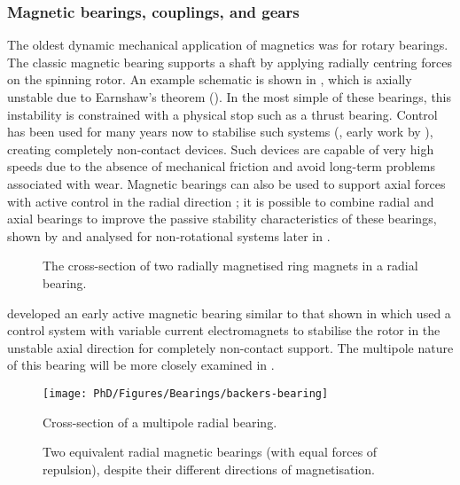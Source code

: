 \documentclass[11pt,a4paper]{memoir}
\begin{document}
\subsubsection{Magnetic bearings, couplings, and gears}

The oldest dynamic mechanical application of magnetics was for rotary
bearings.
The classic magnetic bearing supports a shaft by applying radially centring forces on the spinning rotor.
An example schematic is shown in , which is axially unstable due to Earnshaw's theorem ().
In the most simple of these bearings, this instability is constrained with a physical stop such as a thrust bearing.
Control has been used for many years now to stabilise such systems (\eg, early work by \textcite{shimizu1968}), creating completely non-contact devices.
Such devices are capable of very high speeds due to the absence of mechanical friction and avoid long-term problems associated with wear.
Magnetic bearings can also be used to support axial forces with active control in the radial direction \cite{asami2005}; it is possible to combine radial and axial bearings to improve the passive stability characteristics of these bearings, shown by \textcite{delamare1994-ietm} and analysed for non-rotational systems later in .

\begin{figure}
  \caption[Radial bearing cross section.]{The cross-section of two radially
magnetised ring magnets in a radial bearing.}
\end{figure}

\textcite{backers1961} developed an early active magnetic bearing similar to that shown in  which used a control system with variable current electromagnets to stabilise the rotor in the unstable axial direction for completely non-contact support.
The multipole nature of this bearing will be more closely examined in .

\begin{figure}
  \begin{minipage}{0.45\linewidth}\centering
  \texttt{[image: PhD/Figures/Bearings/backers-bearing]}
  \caption[Multipole bearing cross section.]{Cross-section of a
    multipole radial bearing.}
  \end{minipage}\hfill
  \begin{minipage}{0.45\linewidth}\centering
  \caption[Two equivalent radial magnetic bearings.]{Two equivalent radial magnetic bearings
(with equal forces of repulsion), despite their different directions of
magnetisation.}
  \end{minipage}
\end{figure}
\end{document}
